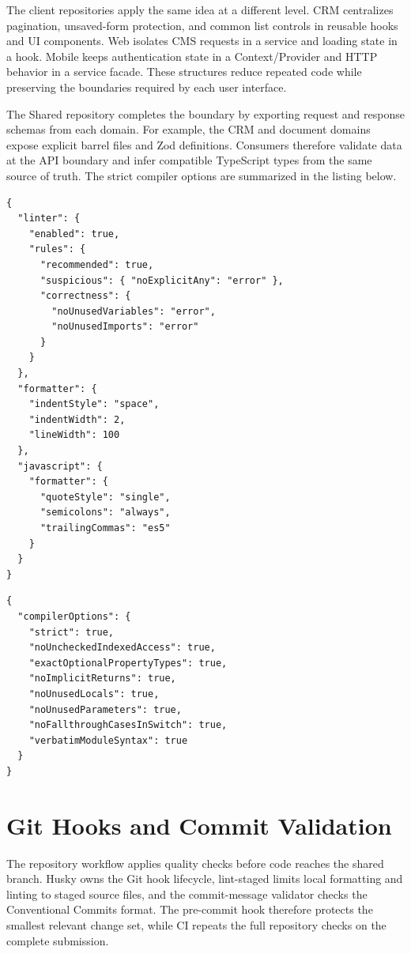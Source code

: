 \documentclass[letterpaper%
, oneside%
, 12pt%
, memoireprojet%
, english%
,creativecommons,hyperref, withAlgo2e %
]{thETS}
\newenvironment{chaptercodeblock}{%
    \par\noindent\begin{minipage}{\linewidth}%
}{%
    \end{minipage}\par%
}
\begin{document}
The client repositories apply the same idea at a different level. CRM centralizes pagination,
unsaved-form protection, and common list controls in reusable hooks and UI components. Web isolates
CMS requests in a service and loading state in a hook. Mobile keeps authentication state in a
Context/Provider and HTTP behavior in a service facade. These structures reduce repeated code while
preserving the boundaries required by each user interface.

The Shared repository completes the boundary by exporting request and response schemas from each
domain. For example, the CRM and document domains expose explicit barrel files and Zod definitions.
Consumers therefore validate data at the API boundary and infer compatible TypeScript types from the
same source of truth. The strict compiler options are summarized in the listing below.
\begin{chaptercodeblock}
\begin{lstlisting}[style=chaptercode,language=chapterjson,caption={Representative Biome quality rules from the API configuration},label={lst:chapter4_biome}]
{
  "linter": {
    "enabled": true,
    "rules": {
      "recommended": true,
      "suspicious": { "noExplicitAny": "error" },
      "correctness": {
        "noUnusedVariables": "error",
        "noUnusedImports": "error"
      }
    }
  },
  "formatter": {
    "indentStyle": "space",
    "indentWidth": 2,
    "lineWidth": 100
  },
  "javascript": {
    "formatter": {
      "quoteStyle": "single",
      "semicolons": "always",
      "trailingCommas": "es5"
    }
  }
}
\end{lstlisting}
\end{chaptercodeblock}

\begin{chaptercodeblock}
\begin{lstlisting}[style=chaptercode,language=chapterjson,caption={Strict TypeScript compiler options},label={lst:chapter4_tsconfig}]
{
  "compilerOptions": {
    "strict": true,
    "noUncheckedIndexedAccess": true,
    "exactOptionalPropertyTypes": true,
    "noImplicitReturns": true,
    "noUnusedLocals": true,
    "noUnusedParameters": true,
    "noFallthroughCasesInSwitch": true,
    "verbatimModuleSyntax": true
  }
}
\end{lstlisting}
\end{chaptercodeblock}

\section{Git Hooks and Commit Validation}
The repository workflow applies quality checks before code reaches the shared branch. Husky owns the
Git hook lifecycle, lint-staged limits local formatting and linting to staged source files, and the
commit-message validator checks the Conventional Commits format. The pre-commit hook therefore
protects the smallest relevant change set, while CI repeats the full repository checks on the
complete submission.
\end{document}
